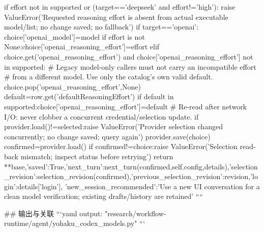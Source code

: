             if effort not in supported or (target=='deepseek' and effort!='high'):
                raise ValueError('Requested reasoning effort is absent from actual executable model/list; no change saved; no fallback')
        if target=='openai':
            choice['openai_model']=model
            if effort is not None:choice['openai_reasoning_effort']=effort
            elif choice.get('openai_reasoning_effort') and choice['openai_reasoning_effort'] not in supported:
                # Legacy model-only callers must not carry an incompatible effort
                # from a different model. Use only the catalog's own valid default.
                choice.pop('openai_reasoning_effort',None)
                default=row.get('defaultReasoningEffort')
                if default in supported:choice['openai_reasoning_effort']=default
        # Re-read after network I/O: never clobber a concurrent credential/selection update.
        if provider.load()!=selected:raise ValueError('Provider selection changed concurrently; no change saved; query again')
        provider.save(choice)
        confirmed=provider.load()
        if confirmed!=choice:raise ValueError('Selection read-back mismatch; inspect status before retrying')
        return {**base,'saved':True,'next_turn':next_turn(confirmed,self.config,details),'selection_revision':selection_revision(confirmed),'previous_selection_revision':revision,'login':details['login'],
                'new_session_recommended':'Use a new UI conversation for a clean model verification; existing drafts/history are retained'}
````

## 输出与关联
```yaml
output: "research/workflow-runtime/agent/yohaku_codex_models.py"
```
